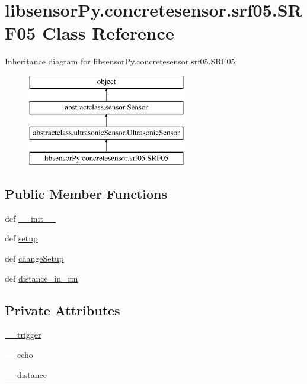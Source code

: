 \hypertarget{classlibsensorPy_1_1concretesensor_1_1srf05_1_1SRF05}{}\section{libsensor\+Py.\+concretesensor.\+srf05.\+S\+R\+F05 Class Reference}
\label{classlibsensorPy_1_1concretesensor_1_1srf05_1_1SRF05}
Inheritance diagram for libsensor\+Py.\+concretesensor.\+srf05.\+S\+R\+F05\+:\begin{figure}[H]
\begin{center}
\leavevmode
\includegraphics[height=4.000000cm]{classlibsensorPy_1_1concretesensor_1_1srf05_1_1SRF05}
\end{center}
\end{figure}
\subsection*{Public Member Functions}
\begin{DoxyCompactItemize}
\item 
def \hyperlink{classlibsensorPy_1_1concretesensor_1_1srf05_1_1SRF05_af64ba58c4d934c548e5a26ec0291d150}{\+\_\+\+\_\+init\+\_\+\+\_\+}
\item 
def \hyperlink{classlibsensorPy_1_1concretesensor_1_1srf05_1_1SRF05_a6139574b888c3e97b5ddb39ce8dae0e8}{setup}
\item 
def \hyperlink{classlibsensorPy_1_1concretesensor_1_1srf05_1_1SRF05_af020edd85bb1170d3e7dd7d3a5417e7b}{change\+Setup}
\item 
def \hyperlink{classlibsensorPy_1_1concretesensor_1_1srf05_1_1SRF05_a1de6e3068884e1ae8c1319950e28b7a2}{distance\+\_\+in\+\_\+cm}
\end{DoxyCompactItemize}
\subsection*{Private Attributes}
\begin{DoxyCompactItemize}
\item 
\hyperlink{classlibsensorPy_1_1concretesensor_1_1srf05_1_1SRF05_af18632c63985ca84659f5afc078ff123}{\+\_\+\+\_\+trigger}
\item 
\hyperlink{classlibsensorPy_1_1concretesensor_1_1srf05_1_1SRF05_a3bfe40dbeab5057a5c3606557304b8a7}{\+\_\+\+\_\+echo}
\item 
\hyperlink{classlibsensorPy_1_1concretesensor_1_1srf05_1_1SRF05_a27f4ab4877edae42d2e67f931b07ba9f}{\+\_\+\+\_\+distance}
\end{DoxyCompactItemize}


